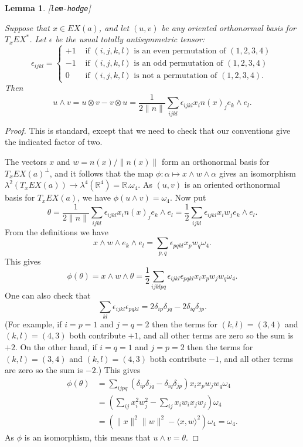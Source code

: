 \documentclass[reqno]{amsart}
\newcommand{\lbl}[1]{\label{#1}\textup{[\texttt{#1}]}\par}
\newcommand{\lbl}{\label}
\newcommand{\al}        {\alpha}
\newcommand{\dl}        {\delta}
\newcommand{\ep}        {\epsilon}
\newcommand{\tht}       {\theta}
\newcommand{\lm}        {\lambda}
\newcommand{\om}        {\omega}
\newcommand{\R}         {{\mathbb{R}}}
\newcommand{\ip}[1]     {\langle #1\rangle}
\newcommand{\ot}        {\otimes}
\renewcommand{\:}{\colon}
\newtheorem{lemma}[theorem]{Lemma}
\theoremstyle{definition}
\begin{document}
\begin{lemma}\lbl{lem-hodge}
 Suppose that $x\in EX(a)$, and let $(u,v)$ be any oriented
 orthonormal basis for $T_xEX^*$.  Let $\ep$ be the usual totally
 antisymmetric tensor:
 \[ \ep_{ijkl} = \begin{cases}
     +1 & \text{ if $(i,j,k,l)$ is an even permutation of $(1,2,3,4)$} \\
     -1 & \text{ if $(i,j,k,l)$ is an odd  permutation of $(1,2,3,4)$} \\
      0 & \text{ if $(i,j,k,l)$ is not a   permutation of $(1,2,3,4)$}.
    \end{cases}
 \]
 Then
 \[ u\wedge v = u\ot v - v\ot u =
     \frac{1}{2\|n\|}\sum_{ijkl}\ep_{ijkl}x_in(x)_je_k\wedge e_l.
 \]
\end{lemma}
\begin{proof}
 This is standard, except that we need to check that our conventions
 give the indicated factor of two.

 The vectors $x$ and $w=n(x)/\|n(x)\|$ form an orthonormal basis for
 $T_xEX(a)^\perp$, and it follows that the map
 $\phi\:\al\mapsto x\wedge w\wedge\al$ gives an isomorphism
 $\lm^2(T_xEX(a))\to\lm^4(\R^4)=\R.\om_4$.  As $(u,v)$ is an oriented
 orthonormal basis for $T_xEX(a)$, we have $\phi(u\wedge v)=\om_4$.
 Now put
 \[ \tht =
     \frac{1}{2\|n\|}\sum_{ijkl}\ep_{ijkl}x_in(x)_je_k\wedge e_l =
     \frac{1}{2}\sum_{ijkl}\ep_{ijkl}x_iw_je_k\wedge e_l.
 \]
 From the definitions we have
 \[ x\wedge w\wedge e_k\wedge e_l =
     \sum_{p,q} \ep_{pqkl} x_pw_q\om_4.
 \]
 This gives
 \[ \phi(\tht) = x\wedge w\wedge\tht =
     \frac{1}{2}\sum_{ijklpq}
      \ep_{ijkl}\ep_{pqkl} x_ix_pw_jw_q\om_4.
 \]
 One can also check that
 \[ \sum_{kl} \ep_{ijkl}\ep_{pqkl} =
     2\dl_{ip}\dl_{jq} - 2\dl_{iq}\dl_{jp}.
 \]
 (For example, if $i=p=1$ and $j=q=2$ then the terms for $(k,l)=(3,4)$
 and $(k,l)=(4,3)$ both contribute $+1$, and all other terms are zero
 so the sum is $+2$.  On the other hand, if $i=q=1$ and $j=p=2$ then
 the terms for $(k,l)=(3,4)$ and $(k,l)=(4,3)$ both contribute $-1$,
 and all other terms are zero so the sum is $-2$.)  This gives
 \begin{align*}
  \phi(\tht) &=
    \sum_{ijpq}
      (\dl_{ip}\dl_{jq} - \dl_{iq}\dl_{jp}) x_ix_pw_jw_q\om_4 \\
  &= \left(\sum_{ij} x_i^2w_j^2 - \sum_{ij} x_iw_ix_jw_j\right)\om_4 \\
  &= (\|x\|^2\|w\|^2 - \ip{x,w}^2)\om_4 = \om_4.
 \end{align*}
 As $\phi$ is an isomorphism, this means that $u\wedge v=\tht$.
\end{proof}
\end{document}
